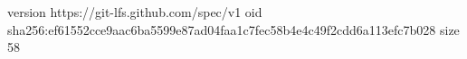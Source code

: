 version https://git-lfs.github.com/spec/v1
oid sha256:ef61552cce9aac6ba5599e87ad04faa1c7fec58b4e4c49f2cdd6a113efc7b028
size 58
